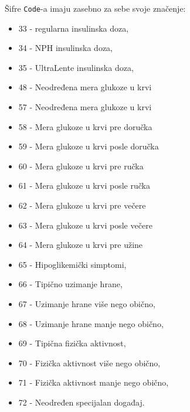 \documentclass[fontsize=12bp, paper=a4]{scrarticle}
\begin{document}
\vbox{}

Šifre \verb|Code|-a imaju zasebno za sebe svoje značenje:
\begin{itemize}
    \itemsep0em
    \item  33 - regularna insulinska doza,
    \item 34 - NPH insulinska doza,
    \item 35 - UltraLente insulinska doza,
    \item 48 - Neodređena mera glukoze u krvi
    \item 57 - Neodređena mera glukoze u krvi
    \item 58 - Mera glukoze u krvi pre doručka
    \item 59 - Mera glukoze u krvi posle doručka
    \item 60 - Mera glukoze u krvi pre ručka
    \item  61 - Mera glukoze u krvi posle ručka
    \item 62 - Mera glukoze u krvi pre večere
    \item 63 - Mera glukoze u krvi posle večere
    \item 64 - Mera glukoze u krvi pre užine
    \item 65 - Hipoglikemički simptomi,
    \item 66 - Tipično uzimanje hrane,
    \item 67 - Uzimanje hrane više nego obično,
    \item 68 - Uzimanje hrane manje nego obično,
    \item 69 - Tipična fizička aktivnost,
    \item 70 - Fizička aktivnost više nego obično,
    \item 71 - Fizička aktivnost manje nego obično,
    \item 72 - Neodređen specijalan događaj.
\end{itemize}

\vbox{}
\end{document}

